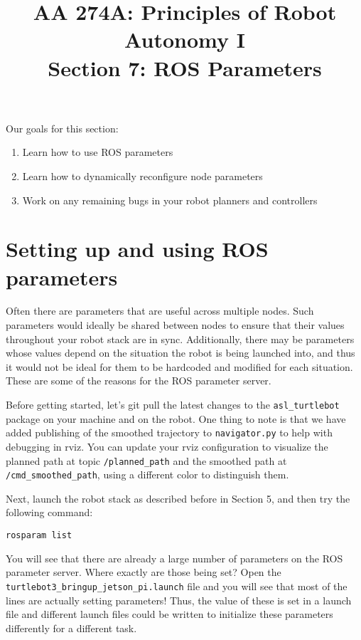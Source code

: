 \documentclass{article}
\title{AA 274A: Principles of Robot Autonomy I \\ Section 7: ROS Parameters}
\date{}
\begin{document}
\maketitle
\pagestyle{fancy}

Our goals for this section: \begin{enumerate}
	\item Learn how to use ROS parameters
    \item Learn how to dynamically reconfigure node parameters
    \item Work on any remaining bugs in your robot planners and controllers
\end{enumerate}

\section{Setting up and using ROS parameters}
Often there are parameters that are useful across multiple nodes. Such parameters would ideally be shared between nodes to ensure that their values throughout your robot stack are in sync. Additionally, there may be parameters whose values depend on the situation the robot is being launched into, and thus it would not be ideal for them to be hardcoded and modified for each situation. These are some of the reasons for the ROS parameter server.

Before getting started, let’s git pull the latest changes to the \texttt{asl\_turtlebot} package on your machine and on the robot. One thing to note is that we have added publishing of the smoothed trajectory to \texttt{navigator.py} to help with debugging in rviz. You can update your rviz configuration to visualize the planned path at topic \texttt{/planned\_path} and the smoothed path at \texttt{/cmd\_smoothed\_path}, using a different color to distinguish them.

Next, launch the robot stack as described before in Section 5, and then try the following command:
\begin{lstlisting}
rosparam list
\end{lstlisting}

You will see that there are already a large number of parameters on the ROS parameter server. Where exactly are those being set? Open the \texttt{turtlebot3\_bringup\_jetson\_pi.launch} file and you will see that most of the lines are actually setting parameters! Thus, the value of these is set in a launch file and different launch files could be written to initialize these parameters differently for a different task.
\end{document}
